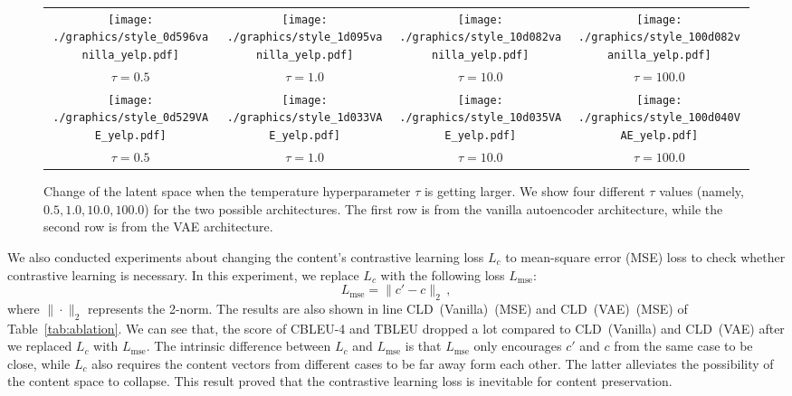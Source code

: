\documentclass[11pt,a4paper]{article}
\newcommand{\Mname}{CLD}
\begin{document}
\begin{figure*}
    \centering
   
    \begin{tabular}{cccc}
     \texttt{[image: ./graphics/style\_0d596vanilla\_yelp.pdf]}&
     \texttt{[image: ./graphics/style\_1d095vanilla\_yelp.pdf]}&
     \texttt{[image: ./graphics/style\_10d082vanilla\_yelp.pdf]}&
     \texttt{[image: ./graphics/style\_100d082vanilla\_yelp.pdf]}\\
     $\tau=0.5$ & $\tau=1.0$ & $\tau=10.0$ & $\tau=100.0$ \\
     \texttt{[image: ./graphics/style\_0d529VAE\_yelp.pdf]} &
      \texttt{[image: ./graphics/style\_1d033VAE\_yelp.pdf]} &
      \texttt{[image: ./graphics/style\_10d035VAE\_yelp.pdf]} &
      \texttt{[image: ./graphics/style\_100d040VAE\_yelp.pdf]}\\
     $\tau=0.5$ & $\tau=1.0$ & $\tau=10.0$ & $\tau=100.0$ \\
    \end{tabular}
    \caption{Change of the latent space when the temperature hyperparameter $\tau$ is getting larger. We show four different $\tau$ values (namely,  ${0.5, 1.0, 10.0, 100.0}$) for the two possible architectures. The first row is from the vanilla autoencoder architecture, while the second row is from the VAE architecture.}
    \label{fig:tau}
\end{figure*}
We also conducted experiments about changing the content's contrastive learning loss $L_c$ to mean-square error (MSE) loss to check whether contrastive learning is necessary. In this experiment, we replace $L_c$ with the following loss $L_\text{mse}$:
\begin{equation}
    L_\text{mse} = \|c' - c\|_2\,,
\end{equation}
where $\|\cdot\|_2$ represents the 2-norm.
The results are also shown in  line \Mname~(Vanilla)~(MSE) and \Mname~(VAE)~(MSE) of Table~\ref{tab:ablation}. We can see that, the score of CBLEU-4 and TBLEU dropped a lot compared to \Mname~(Vanilla) and \Mname~(VAE) after we replaced $L_c$ with   $L_\text{mse}$. The intrinsic difference between $L_c$ and   $L_\text{mse}$ is that $L_\text{mse}$ only encourages $c'$ and $c$ from the same case to be close, while $L_c$ also requires the content vectors from different cases to be far away form each other. The latter alleviates the possibility of the content space to  collapse. This result proved that the contrastive learning loss is inevitable for content preservation.
\end{document}
